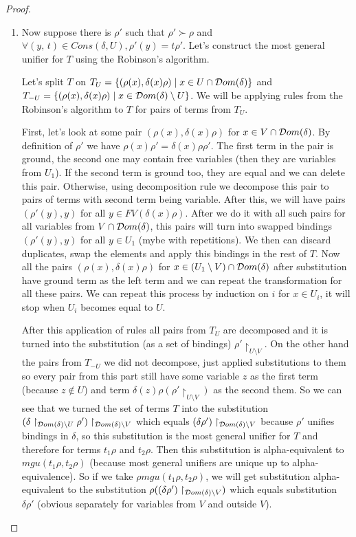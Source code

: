 \begin{proof}
\begin{enumerate}
\item Now suppose there is $\rho'$ such that $\rho' \succ \rho$ and $\forall (y, \, t) \in Cons(\delta, U), \rho'(y) = t \rho'$. Let's construct the most general unifier for $T$ using the Robinson's algorithm.

Let's split $T$ on $T_U = \{ (\rho(x), \delta(x) \rho) \mid x \in U \cap \mathcal{D}om(\delta) \}$ and $T_{-U} = \{ (\rho(x), \delta(x) \rho) \mid x \in  \mathcal{D}om(\delta) \setminus U \}$. We will be applying rules from the Robinson's algorithm to $T$ for pairs of terms from $T_U$.

First, let's look at some pair $(\rho(x), \delta(x) \rho)$ for $x \in V \cap \mathcal{D}om(\delta)$. By definition of $\rho'$ we have $\rho(x) \rho' = \delta(x) \rho \rho'$. The first term in the pair is ground, the second one may contain free variables (then they are variables from $U_1$). If the second term is ground too, they are equal and we can delete this pair. Otherwise, using decomposition rule we decompose this pair to pairs of terms with second term being variable. After this, we will have pairs $(\rho'(y), y)$ for all $y \in FV(\delta(x) \rho)$. After we do it with all such pairs for all variables from $V \cap \mathcal{D}om(\delta)$, this pairs will turn into swapped bindings $(\rho'(y), y)$ for all $y \in U_1$ (mybe with repetitions). We then can discard duplicates, swap the elements and apply this bindings in the rest of $T$. Now all the pairs $(\rho(x), \delta(x) \rho)$ for $x \in (U_1 \setminus V) \cap \mathcal{D}om(\delta)$ after substitution have ground term as the left term and we can repeat the transformation for all these pairs. We can repeat this process by induction on $i$ for $x \in U_i$, it will stop when $U_i$ becomes equal to $U$.

After this application of rules all pairs from $T_U$ are decomposed and it is turned into the substitution (as a set of bindings) $\rho'\restriction_{U \setminus V}$. On the other hand the pairs from $T_{-U}$ we did not decompose, just applied substitutions to them so every pair from this part still have some variable $z$ as the first term (because $z \not\in U$) and term $\delta(z) \rho (\rho'\restriction_{U \setminus V})$ as the second them. So we can see that we turned the set of terms $T$ into the substitution ${(\delta\restriction_{\mathcal{D}om(\delta) \setminus U} \rho')\restriction_{\mathcal{D}om(\delta) \setminus V}}$ which equals ${(\delta \rho')\restriction_{\mathcal{D}om(\delta) \setminus V}}$ because $\rho'$ unifies bindings in $\delta$, so this substitution is the most general unifier for $T$ and therefore for terms $t_1 \rho$ and $t_2 \rho$. Then this substitution is alpha-equivalent to $mgu(t_1 \rho, t_2 \rho)$ (because most general unifiers are unique up to alpha-equivalence). So if we take $\rho mgu(t_1 \rho, t_2 \rho)$, we will get substitution alpha-equivalent to the substitution ${\rho ((\delta \rho')\restriction_{\mathcal{D}om(\delta) \setminus V})}$ which equals substitution $\delta \rho'$ (obvious separately for variables from $V$ and outside $V$).
 

\end{enumerate}


\end{proof}

